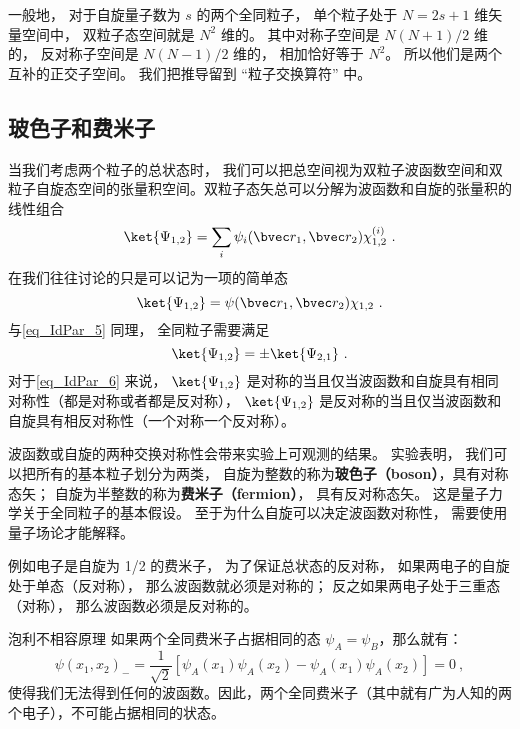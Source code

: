一般地， 对于自旋量子数为 $s$ 的两个全同粒子， 单个粒子处于 $N = 2s+1$ 维矢量空间中， 双粒子态空间就是 $N^2$ 维的。 其中对称子空间是 $N(N+1)/2$ 维的， 反对称子空间是 $N(N-1)/2$ 维的， 相加恰好等于 $N^2$。 所以他们是两个互补的正交子空间。 我们把推导留到 “粒子交换算符” 中。

\subsection{玻色子和费米子}
当我们考虑两个粒子的总状态时， 我们可以把总空间视为双粒子波函数空间和双粒子自旋态空间的张量积空间。双粒子态矢总可以分解为波函数和自旋的张量积的线性组合 %
\begin{equation}
\ket{\Psi_{1,2}} = \sum_i \psi_i(\bvec r_1, \bvec r_2) \chi^{(i)}_{1,2}~.
\end{equation}
在我们往往讨论的只是可以记为一项的简单态
\begin{equation}\label{eq_IdPar_6}
\ket{\Psi_{1,2}} = \psi(\bvec r_1, \bvec r_2) \chi_{1,2}~.
\end{equation}
与\autoref{eq_IdPar_5} 同理， 全同粒子需要满足
\begin{equation}\label{eq_IdPar_4}
\ket{\Psi_{1,2}} = \pm \ket{\Psi_{2,1}}~.
\end{equation}
对于\autoref{eq_IdPar_6} 来说， $\ket{\Psi_{1,2}}$ 是对称的当且仅当波函数和自旋具有相同对称性（都是对称或者都是反对称）， $\ket{\Psi_{1,2}}$ 是反对称的当且仅当波函数和自旋具有相反对称性（一个对称一个反对称）。

波函数或自旋的两种交换对称性会带来实验上可观测的结果。 实验表明， 我们可以把所有的基本粒子划分为两类， 自旋为整数的称为\textbf{玻色子（boson）}，具有对称态矢； 自旋为半整数的称为\textbf{费米子（fermion）}， 具有反对称态矢。 这是量子力学关于全同粒子的基本假设。 至于为什么自旋可以决定波函数对称性， 需要使用量子场论才能解释。 %

例如电子是自旋为 1/2 的费米子， 为了保证总状态的反对称， 如果两电子的自旋处于单态（反对称）， 那么波函数就必须是对称的； 反之如果两电子处于三重态（对称）， 那么波函数必须是反对称的。

\begin{corollary}{泡利不相容原理}
如果两个全同费米子占据相同的态 $\psi_A=\psi_B$，那么就有：
\begin{equation}
\psi(x_1,x_2)_-=\frac{1}{\sqrt{2}}[\psi_A(x_1)\psi_A(x_2)-\psi_A(x_1)\psi_A(x_2)]=0~,
\end{equation}
使得我们无法得到任何的波函数。因此，两个全同费米子（其中就有广为人知的两个电子），不可能占据相同的状态。
\end{corollary}

